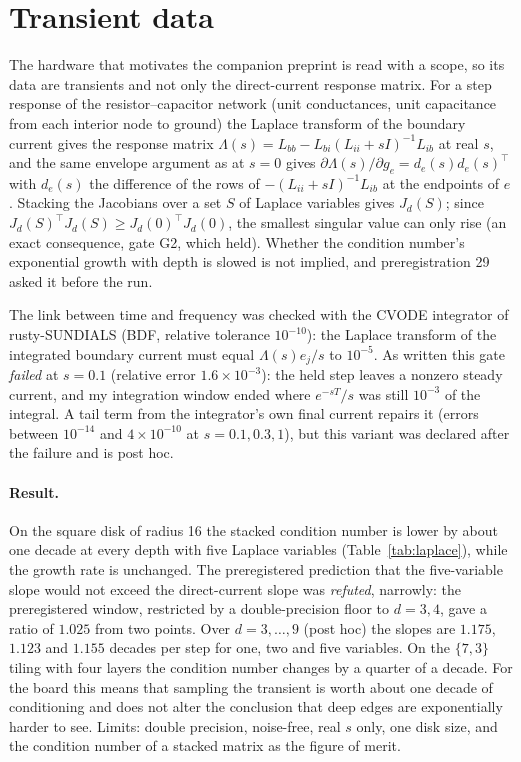 \documentclass[11pt,a4paper]{article}
\begin{document}
\section{Transient data}\label{sec:laplace}
The hardware that motivates the companion preprint is read with a scope, so its data are transients and not only the direct-current response matrix.
For a step response of the resistor--capacitor network (unit conductances, unit capacitance from each interior node to ground) the Laplace transform of
the boundary current gives the response matrix $\Lambda(s)=L_{bb}-L_{bi}(L_{ii}+sI)^{-1}L_{ib}$ at real $s$, and the same envelope argument as at $s=0$ gives
$\partial\Lambda(s)/\partial g_e=d_e(s)d_e(s)^{\top}$ with $d_e(s)$ the difference of the rows of $-(L_{ii}+sI)^{-1}L_{ib}$ at the endpoints of $e$. Stacking the Jacobians
over a set $S$ of Laplace variables gives $J_d(S)$; since $J_d(S)^{\top}J_d(S)\ge J_d(0)^{\top}J_d(0)$, the smallest singular value can only rise
(an exact consequence, gate G2, which held). Whether the condition number's exponential growth with depth is slowed is not implied, and preregistration 29 asked it before the run.

The link between time and frequency was checked with the CVODE integrator of rusty-SUNDIALS (BDF, relative tolerance $10^{-10}$): the Laplace transform of the integrated boundary current
must equal $\Lambda(s)e_j/s$ to $10^{-5}$. As written this gate \emph{failed} at $s=0.1$ (relative error $1.6\times10^{-3}$): the held step leaves a nonzero steady current, and my
integration window ended where $e^{-sT}/s$ was still $10^{-3}$ of the integral. A tail term from the integrator's own final current repairs it (errors between $10^{-14}$ and $4\times10^{-10}$ at $s=0.1,0.3,1$),
but this variant was declared after the failure and is post hoc.

\paragraph{Result.} On the square disk of radius 16 the stacked condition number is lower by about one decade at every depth with five Laplace variables
(Table~\ref{tab:laplace}), while the growth rate is unchanged. The preregistered prediction that the five-variable slope would not exceed the direct-current slope was
\emph{refuted}, narrowly: the preregistered window, restricted by a double-precision floor to $d=3,4$, gave a ratio of $1.025$ from two points. Over $d=3,\dots,9$ (post hoc) the slopes
are $1.175$, $1.123$ and $1.155$ decades per step for one, two and five variables. On the $\{7,3\}$ tiling with four layers the condition number changes by a quarter of a decade.
For the board this means that sampling the transient is worth about one decade of conditioning and does not alter the conclusion that deep edges are exponentially harder to see.
Limits: double precision, noise-free, real $s$ only, one disk size, and the condition number of a stacked matrix as the figure of merit.
\end{document}
